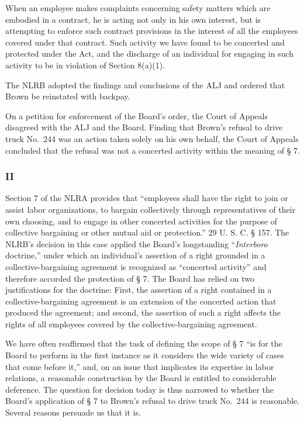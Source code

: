 \documentclass[
  letterpaper,
  11pt,
  DIV=9,
  openright]{scrbook}
\renewenvironment{quote}{
  \list{}{\leftmargin=2em\rightmargin=2em}
  \item\relax\small
}
{\endlist}
\begin{document}
\begin{quote}
When an employee makes complaints concerning safety matters which are
embodied in a contract, he is acting not only in his own interest, but
is attempting to enforce such contract provisions in the interest of all
the employees covered under that contract. Such activity we have found
to be concerted and protected under the Act, and the discharge of an
individual for engaging in such activity to be in violation of Section
8(a)(1).
\end{quote}

The NLRB adopted the findings and conclusions of the ALJ and ordered
that Brown be reinstated with backpay.

On a petition for enforcement of the Board's order, the Court of Appeals
disagreed with the ALJ and the Board. Finding that Brown's refusal to
drive truck No.~244 was an action taken solely on his own behalf, the
Court of Appeals concluded that the refusal was not a concerted activity
within the meaning of § 7.

\subsubsection{II}\label{ii}

Section 7 of the NLRA provides that ``employees shall have the right to
join or assist labor organizations, to bargain collectively through
representatives of their own choosing, and to engage in other concerted
activities for the purpose of collective bargaining or other mutual aid
or protection.'' 29 U. S. C. § 157. The NLRB's decision in this case
applied the Board's longstanding ``\emph{Interboro} doctrine,'' under
which an individual's assertion of a right grounded in a
collective-bargaining agreement is recognized as ``concerted activity''
and therefore accorded the protection of § 7. The Board has relied on
two justifications for the doctrine: First, the assertion of a right
contained in a collective-bargaining agreement is an extension of the
concerted action that produced the agreement; and second, the assertion
of such a right affects the rights of all employees covered by the
collective-bargaining agreement.

We have often reaffirmed that the task of defining the scope of § 7 ``is
for the Board to perform in the first instance as it considers the wide
variety of cases that come before it,'' and, on an issue that implicates
its expertise in labor relations, a reasonable construction by the Board
is entitled to considerable deference. The question for decision today
is thus narrowed to whether the Board's application of § 7 to Brown's
refusal to drive truck No.~244 is reasonable. Several reasons persuade
us that it is.
\end{document}
